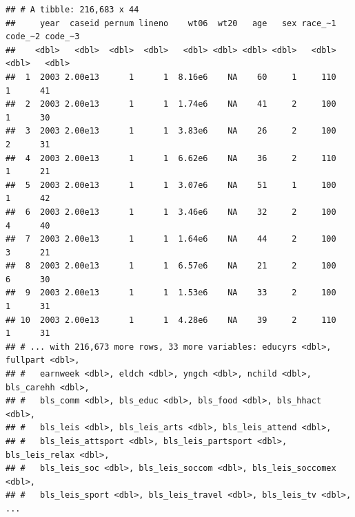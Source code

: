 \documentclass[
]{article}
\begin{document}
\begin{verbatim}
## # A tibble: 216,683 x 44
##     year  caseid pernum lineno    wt06  wt20   age   sex race_~1 code_~2 code_~3
##    <dbl>   <dbl>  <dbl>  <dbl>   <dbl> <dbl> <dbl> <dbl>   <dbl>   <dbl>   <dbl>
##  1  2003 2.00e13      1      1  8.16e6    NA    60     1     110       1      41
##  2  2003 2.00e13      1      1  1.74e6    NA    41     2     100       1      30
##  3  2003 2.00e13      1      1  3.83e6    NA    26     2     100       2      31
##  4  2003 2.00e13      1      1  6.62e6    NA    36     2     110       1      21
##  5  2003 2.00e13      1      1  3.07e6    NA    51     1     100       1      42
##  6  2003 2.00e13      1      1  3.46e6    NA    32     2     100       4      40
##  7  2003 2.00e13      1      1  1.64e6    NA    44     2     100       3      21
##  8  2003 2.00e13      1      1  6.57e6    NA    21     2     100       6      30
##  9  2003 2.00e13      1      1  1.53e6    NA    33     2     100       1      31
## 10  2003 2.00e13      1      1  4.28e6    NA    39     2     110       1      31
## # ... with 216,673 more rows, 33 more variables: educyrs <dbl>, fullpart <dbl>,
## #   earnweek <dbl>, eldch <dbl>, yngch <dbl>, nchild <dbl>, bls_carehh <dbl>,
## #   bls_comm <dbl>, bls_educ <dbl>, bls_food <dbl>, bls_hhact <dbl>,
## #   bls_leis <dbl>, bls_leis_arts <dbl>, bls_leis_attend <dbl>,
## #   bls_leis_attsport <dbl>, bls_leis_partsport <dbl>, bls_leis_relax <dbl>,
## #   bls_leis_soc <dbl>, bls_leis_soccom <dbl>, bls_leis_soccomex <dbl>,
## #   bls_leis_sport <dbl>, bls_leis_travel <dbl>, bls_leis_tv <dbl>, ...
\end{verbatim}
\end{document}
